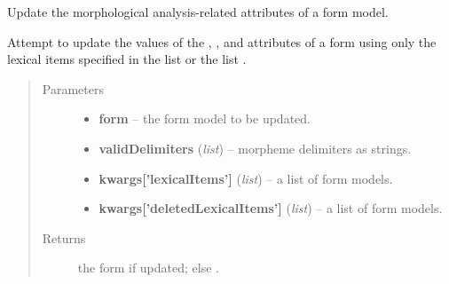 \documentclass[letterpaper,10pt,english]{sphinxmanual}
\begin{document}

\begin{fulllineitems}
\label{api:onlinelinguisticdatabase.controllers.forms.updateMorphemeReferencesOfForm}
Update the morphological analysis-related attributes of a form model.

Attempt to update the values of the ,
,  and 
attributes of a form using only the lexical items specified in the list
 or the list .
\begin{quote}\begin{description}
\item[{Parameters}] \leavevmode\begin{itemize}
\item {} 
\textbf{form} -- the form model to be updated.

\item {} 
\textbf{validDelimiters} (\emph{list}) -- morpheme delimiters as strings.

\item {} 
\textbf{kwargs{[}'lexicalItems'{]}} (\emph{list}) -- a list of form models.

\item {} 
\textbf{kwargs{[}'deletedLexicalItems'{]}} (\emph{list}) -- a list of form models.

\end{itemize}

\item[{Returns}] \leavevmode
the form if updated; else .

\end{description}\end{quote}

\end{fulllineitems}

\end{document}
